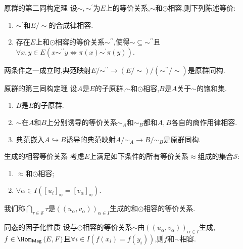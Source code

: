 \begin{theorem}{原群的第二同构定理}{}
	设$\sim,\sim^{\prime}$为$E$上的等价关系,$\sim$和$\odot$相容,则下列陈述等价:
	\begin{enumerate}
		\item $\sim^{\prime}$和$E/\sim$的合成律相容.
		\item 存在$E$上和$\odot$相容的等价关系$\sim^{\prime\prime}$,使得$\sim\subseteq\sim^{\prime\prime}$且$\forall x,y\in E\left(x\sim^{\prime\prime}y\iff\pi\left(x\right)\sim^{\prime}\pi\left(y\right)\right)$.
	\end{enumerate}
	两条件之一成立时,典范映射$E/\sim^{\prime\prime}\to\left(E/\sim\right)/\left(\sim^{\prime\prime}/\sim\right)$是原群同构.
\end{theorem}

\begin{theorem}{原群的第三同构定理}{}
	设$A$是$E$的子原群,$\sim$和$\odot$相容,$B$是$A$关于$\sim$的饱和集.
	\begin{enumerate}
		\item $B$是$E$的子原群.
		\item $\sim$在$A$和$B$上分别诱导的等价关系$\sim_{A}$和$\sim_{B}$都和$A,B$各自的商作用律相容.
		\item 典范嵌入$A\hookrightarrow B$诱导的典范映射$A/\sim_{A}\to B/\sim_{B}$是原群同构.
	\end{enumerate}
\end{theorem}

\begin{definition}{生成的相容等价关系}{}
	考虑$E$上满足如下条件的所有等价关系$\approx$组成的集合$\mathcal{S}$:
	\begin{enumerate}
		\item $\approx$和$\odot$相容;
		\item $\forall\alpha\in I\left(\left[u_{i}\right]_{\approx}=\left[v_{\alpha}\right]_{\approx}\right)$.
	\end{enumerate}
		我们称$\bigcap\limits_{\tau\in\mathcal{S}}\tau$是$\left(\left(u_{\alpha},v_{\alpha}\right)\right)_{\alpha\in I}$生成的和$\odot$相容的等价关系.
\end{definition}

\begin{proposition}{同态的因子化性质}{}
	设与$\odot$相容的等价关系$\sim$由$\left(\left(u_{\alpha},v_{\alpha}\right)\right)_{\alpha\in I}$生成,$f\in\Hom_{\mathsf{Mag}}\left(E,F\right)$且$\forall i\in I\left(f\left(x_{i}\right)=f\left(y_{i}\right)\right)$,则$f$和$\sim$相容.
\end{proposition}
